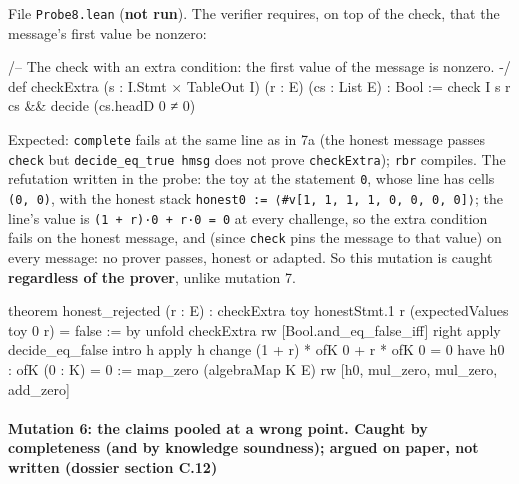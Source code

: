 File \texttt{Probe8.\allowbreak{}lean} (\textbf{not run}). The verifier requires, on top of the check, that the message's first value be nonzero:

\begin{leancode}
/-- The check with an extra condition: the first value of the message is nonzero. -/
def checkExtra (s : I.Stmt × TableOut I) (r : E) (cs : List E) : Bool :=
  check I s r cs && decide (cs.headD 0 ≠ 0)
\end{leancode}

Expected: \texttt{complete} fails at the same line as in 7a (the honest message passes \texttt{check} but \texttt{decide\_\allowbreak{}eq\_\allowbreak{}true hmsg} does not prove \texttt{checkExtra}); \texttt{rbr} compiles. The refutation written in the probe: the toy at the statement \texttt{0}, whose line has cells \texttt{(\allowbreak{}0,\allowbreak{} 0)}, with the honest stack \texttt{h\allowbreak{}o\allowbreak{}n\allowbreak{}e\allowbreak{}s\allowbreak{}t\allowbreak{}0\allowbreak{} :\allowbreak{}=\allowbreak{} ⟨\allowbreak{}\#\allowbreak{}v\allowbreak{}[\allowbreak{}1\allowbreak{},\allowbreak{} 1\allowbreak{},\allowbreak{} 1\allowbreak{},\allowbreak{} 1\allowbreak{},\allowbreak{} 0\allowbreak{},\allowbreak{} 0\allowbreak{},\allowbreak{} 0\allowbreak{},\allowbreak{} 0\allowbreak{}]\allowbreak{}⟩}; the line's value is \texttt{(\allowbreak{}1 + r)·0 + r·0 = 0} at every challenge, so the extra condition fails on the honest message, and (since \texttt{check} pins the message to that value) on every message: no prover passes, honest or adapted. So this mutation is caught \textbf{regardless of the prover}, unlike mutation 7.

\begin{leancode}
theorem honest_rejected (r : E) :
    checkExtra toy honestStmt.1 r (expectedValues toy 0 r) = false := by
  unfold checkExtra
  rw [Bool.and_eq_false_iff]
  right
  apply decide_eq_false
  intro h
  apply h
  change (1 + r) * ofK 0 + r * ofK 0 = 0
  have h0 : ofK (0 : K) = 0 := map_zero (algebraMap K E)
  rw [h0, mul_zero, mul_zero, add_zero]
\end{leancode}

\paragraph{Mutation 6: the claims pooled at a wrong point. Caught by completeness (and by knowledge soundness); argued on paper, not written (dossier section C.12)}\label{sec:gen-pubinput-C12}

